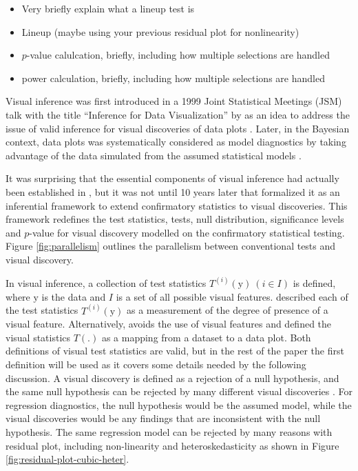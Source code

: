 \documentclass[]{interact}
\theoremstyle{plain}%
\theoremstyle{definition}
\theoremstyle{remark}
\begin{document}
\begin{itemize}
\item
  Very briefly explain what a lineup test is
\item
  Lineup (maybe using your previous residual plot for nonlinearity)
\item
  \(p\)-value calulcation, briefly, including how multiple selections
  are handled
\item
  power calculation, briefly, including how multiple selections are
  handled
\end{itemize}

Visual inference was first introduced in a 1999 Joint Statistical
Meetings (JSM) talk with the title ``Inference for Data Visualization''
by \citet{buja_inference_1999} as an idea to address the issue of valid
inference for visual discoveries of data plots
\citep{gelman_exploratory_2004}. Later, in the Bayesian context, data
plots was systematically considered as model diagnostics by taking
advantage of the data simulated from the assumed statistical models
\citep{gelman_bayesian_2003, gelman_exploratory_2004}.

It was surprising that the essential components of visual inference had
actually been established in \citet{buja_inference_1999}, but it was not
until 10 years later that \citet{buja_statistical_2009} formalized it as
an inferential framework to extend confirmatory statistics to visual
discoveries. This framework redefines the test statistics, tests, null
distribution, significance levels and \(p\)-value for visual discovery
modelled on the confirmatory statistical testing. Figure
\ref{fig:parallelism} outlines the parallelism between conventional
tests and visual discovery.

In visual inference, a collection of test statistics
\(T^{(i)}(\boldsymbol{\mathrm{y}})~(i \in I)\) is defined, where
\(\boldsymbol{\mathrm{y}}\) is the data and \(I\) is a set of all
possible visual features. \citet{buja_statistical_2009} described each
of the test statistics \(T^{(i)}(\boldsymbol{\mathrm{y}})\) as a
measurement of the degree of presence of a visual feature.
Alternatively, \citet{majumder_validation_2013} avoids the use of visual
features and defined the visual statistics \(T(.)\) as a mapping from a
dataset to a data plot. Both definitions of visual test statistics are
valid, but in the rest of the paper the first definition will be used as
it covers some details needed by the following discussion. A visual
discovery is defined as a rejection of a null hypothesis, and the same
null hypothesis can be rejected by many different visual discoveries
\citep{buja_statistical_2009}. For regression diagnostics, the null
hypothesis would be the assumed model, while the visual discoveries
would be any findings that are inconsistent with the null hypothesis.
The same regression model can be rejected by many reasons with residual
plot, including non-linearity and heteroskedasticity as shown in Figure
\ref{fig:residual-plot-cubic-heter}.
\end{document}
